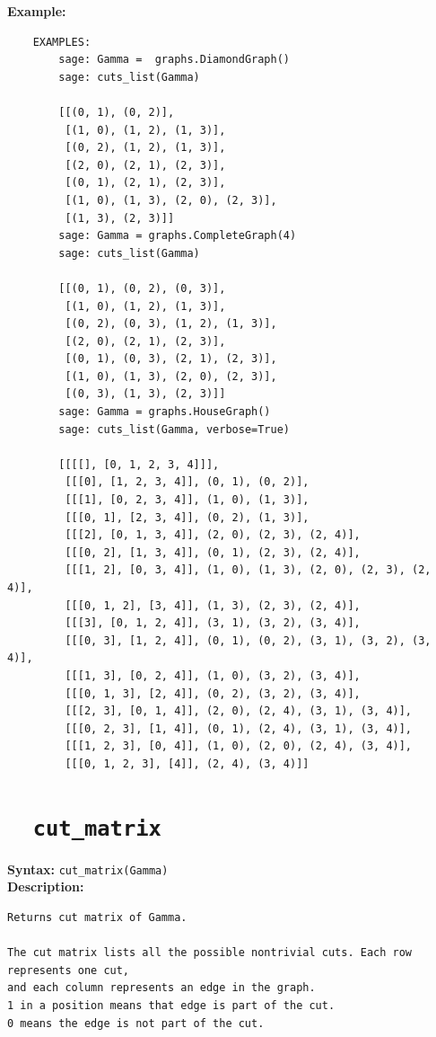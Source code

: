\documentclass{article}
\begin{document}
\textbf{Example:}
\begin{verbatim}
    EXAMPLES:
        sage: Gamma =  graphs.DiamondGraph()
        sage: cuts_list(Gamma)

        [[(0, 1), (0, 2)],
         [(1, 0), (1, 2), (1, 3)],
         [(0, 2), (1, 2), (1, 3)],
         [(2, 0), (2, 1), (2, 3)],
         [(0, 1), (2, 1), (2, 3)],
         [(1, 0), (1, 3), (2, 0), (2, 3)],
         [(1, 3), (2, 3)]]
        sage: Gamma = graphs.CompleteGraph(4)
        sage: cuts_list(Gamma)

        [[(0, 1), (0, 2), (0, 3)],
         [(1, 0), (1, 2), (1, 3)],
         [(0, 2), (0, 3), (1, 2), (1, 3)],
         [(2, 0), (2, 1), (2, 3)],
         [(0, 1), (0, 3), (2, 1), (2, 3)],
         [(1, 0), (1, 3), (2, 0), (2, 3)],
         [(0, 3), (1, 3), (2, 3)]]
        sage: Gamma = graphs.HouseGraph()
        sage: cuts_list(Gamma, verbose=True)

        [[[[], [0, 1, 2, 3, 4]]],
         [[[0], [1, 2, 3, 4]], (0, 1), (0, 2)],
         [[[1], [0, 2, 3, 4]], (1, 0), (1, 3)],
         [[[0, 1], [2, 3, 4]], (0, 2), (1, 3)],
         [[[2], [0, 1, 3, 4]], (2, 0), (2, 3), (2, 4)],
         [[[0, 2], [1, 3, 4]], (0, 1), (2, 3), (2, 4)],
         [[[1, 2], [0, 3, 4]], (1, 0), (1, 3), (2, 0), (2, 3), (2, 4)],
         [[[0, 1, 2], [3, 4]], (1, 3), (2, 3), (2, 4)],
         [[[3], [0, 1, 2, 4]], (3, 1), (3, 2), (3, 4)],
         [[[0, 3], [1, 2, 4]], (0, 1), (0, 2), (3, 1), (3, 2), (3, 4)],
         [[[1, 3], [0, 2, 4]], (1, 0), (3, 2), (3, 4)],
         [[[0, 1, 3], [2, 4]], (0, 2), (3, 2), (3, 4)],
         [[[2, 3], [0, 1, 4]], (2, 0), (2, 4), (3, 1), (3, 4)],
         [[[0, 2, 3], [1, 4]], (0, 1), (2, 4), (3, 1), (3, 4)],
         [[[1, 2, 3], [0, 4]], (1, 0), (2, 0), (2, 4), (3, 4)],
         [[[0, 1, 2, 3], [4]], (2, 4), (3, 4)]]
\end{verbatim}

\section{\tt \ \ cut\_matrix}

\textbf{Syntax:} \verb}cut_matrix(Gamma)}\\

\textbf{Description:}
\begin{verbatim}
Returns cut matrix of Gamma.

The cut matrix lists all the possible nontrivial cuts. Each row represents one cut, 
and each column represents an edge in the graph.
1 in a position means that edge is part of the cut.
0 means the edge is not part of the cut.

\end{verbatim}
\end{document}
